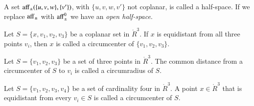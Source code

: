 \begin{tarskidata}
\begin{tarski}

\begin{definition}
A set ${\operatorname{aff}}_{\pm}(\{u,v,w\},\{v'\})$,
with $\{u,v,w,v'\}$ not coplanar, is called a half-space.  If
we replace ${\operatorname{aff}}_{\pm}$ with ${\operatorname{aff}}_{\pm}^0$ we have an
{\it open half-space}.
\end{definition}
\end{tarski}






\begin{tarski}

\begin{definition}[circumcenter]
Let $S=\{x,v_1,v_2,v_3\}$ be a coplanar set in $\ring{R}^3$.  If $x$ 
is equidistant from all three points $v_i$, then $x$ is called a
circumcenter of $\{v_1,v_2,v_3\}$.
\end{definition}
\end{tarski}

\begin{tarski}

\begin{definition}[circumradius]  
Let $S=\{v_1,v_2,v_3\}$ be 
a set of three points in $\ring{R}^3$.
The common distance from a circumcenter of $S$ to $v_i$ is called a
circumradius of $S$.  
\end{definition}
\end{tarski}

\begin{tarski}

\begin{definition}[circumcenter]
Let $S=\{v_1,v_2,v_3,v_4\}$ be a set of cardinality four in $\ring{R}^3$.  
A point $x\in\ring{R}^3$ 
that is equidistant from every $v_i\in S$ is called a
circumcenter of $S$.  
\end{definition}
\end{tarski}


\end{tarskidata}
